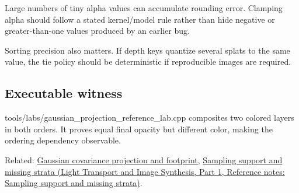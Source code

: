 Large numbers of tiny alpha values can accumulate rounding error. Clamping alpha should follow a stated kernel/model rule rather than hide negative or greater-than-one values produced by an earlier bug.

Sorting precision also matters. If depth keys quantize several splats to the same value, the tie policy should be deterministic if reproducible images are required.

\subsection{Executable witness}\label{appendix-5f4b2e24c3f6-executable-witness}

\hypertarget{appendix-5f4b2e24c3f6-executable-witness}{}

tools/labs/gaussian\_projection\_reference\_lab.cpp composites two colored layers in both orders. It proves equal final opacity but different color, making the ordering dependency observable.

Related: \hyperref[appendix-24269cb6977c]{Gaussian covariance projection and footprint}, \href{../04-Light-Transport-and-Image-Synthesis-P01/main.pdf\#appendix-10308c3d753e}{Sampling support and missing strata (Light Transport and Image Synthesis, Part 1, Reference notes: Sampling support and missing strata)}.
